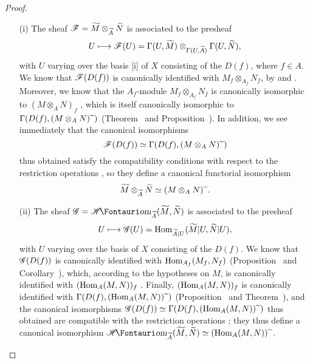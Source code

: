 \begin{proof}
\medskip\noindent
\begin{enumerate}
  \item[(i)] The sheaf $\mathscr{F}=\widetilde{M}\otimes_{\widetilde{A}}\widetilde{N}$ is associated to the presheaf
    \[
      U\mapsto\sh{F}(U)=\Gamma(U,\widetilde{M})\otimes_{\Gamma(U,\widetilde{A})}\Gamma(U,\widetilde{N}),
    \]
    with $U$ varying over the basis [i] of $X$ consisting of the $D(f)$, where $f\in A$.
    We know that $\mathscr{F}(D(f))$ is canonically identified with $M_f\otimes_{A_f}N_f$, by  and .
    Moreover, we know that the $A_f$-module $M_f\otimes_{A_f}N_f$ is canonically
    isomorphic to $(M\otimes_A N)_f$ , which is itself canonically isomorphic to $\Gamma(D(f),(M\otimes_A N){\,\widetilde{\,}\,})$ (Theorem~ and Proposition~).
    In addition, we see immediately that the canonical isomorphisms
    \[
      \mathscr{F}(D(f))\simeq\Gamma(D(f),(M\otimes_A N){\,\widetilde{\,}\,})
    \]
    thus obtained satisfy the compatibility conditions with respect to the restriction operations , so they define a canonical functorial isomorphism
    \[
      \widetilde{M}\otimes_{\widetilde{A}}\widetilde{N}\simeq(M\otimes_A N){\,\widetilde{\,}\,}.
    \]
  \item[(ii)] The sheaf $\sh{G}=\shHom_{\widetilde{A}}(\widetilde{M},\widetilde{N})$ is associated to the presheaf
    \[
      U\mapsto\sh{G}(U)=\Hom_{\widetilde{A}|U}(\widetilde{M}|U,\widetilde{N}|U),
    \]
    with $U$ varying over the basis of $X$ consisting of the $D(f)$.
    We know that $\mathscr{G}(D(f))$ is canonically identified with $\operatorname{Hom}_{A_f}(M_f,N_f)$ (Proposition~ and
    Corollary~), which, according to the hypotheses on $M$, is canonically identified with $(\operatorname{Hom}_A(M,N))_f$ .
    Finally, $(\operatorname{Hom}_A(M,N))_f$ is canonically identified with $\Gamma(D(f),(\operatorname{Hom}_A(M,N)){\,\widetilde{\,}\,})$ (Proposition~ and Theorem~), and the canonical isomorphisms $\mathscr{G}(D(f))\simeq\Gamma(D(f),(\operatorname{Hom}_A(M,N)){\,\widetilde{\,}\,})$ thus obtained are compatible with the restriction operations ;
    they thus define a canonical isomorphism $\shHom_{\widetilde{A}}(\widetilde{M},\widetilde{N})\isoto(\Hom_A(M,N))\supertilde$.
\end{enumerate}
\end{proof}

